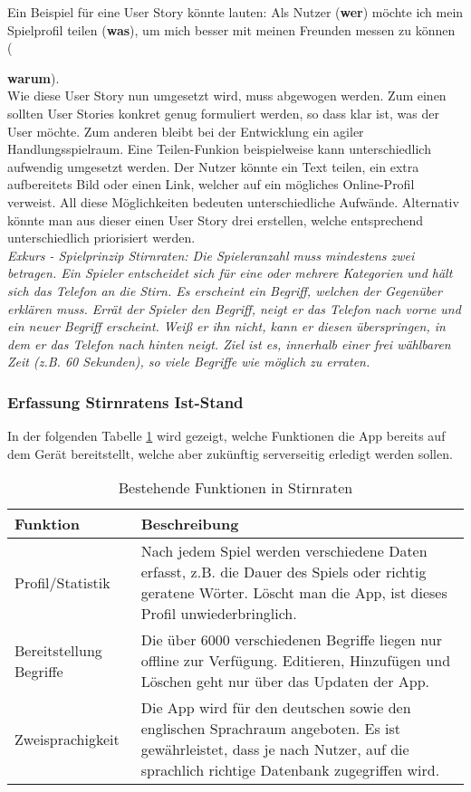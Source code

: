 Ein Beispiel für eine User Story könnte lauten: Als Nutzer (\textbf{wer}) möchte ich mein Spielprofil teilen (\textbf{was}), um mich besser mit meinen Freunden messen zu können ({\textbf{warum}).\\
	
Wie diese User Story nun umgesetzt wird, muss abgewogen werden. Zum einen sollten User Stories konkret genug formuliert werden, so dass klar ist, was der User möchte. Zum anderen bleibt bei der Entwicklung ein agiler Handlungsspielraum.\cite{UserStoryMapping} Eine Teilen-Funkion beispielweise kann unterschiedlich aufwendig umgesetzt werden. Der Nutzer könnte ein Text teilen, ein extra aufbereitets Bild oder einen Link, welcher auf ein mögliches Online-Profil verweist. All diese Möglichkeiten bedeuten unterschiedliche Aufwände. Alternativ könnte man aus dieser einen User Story drei erstellen, welche entsprechend unterschiedlich priorisiert werden.\\

\textit{Exkurs - Spielprinzip Stirnraten: Die Spieleranzahl muss mindestens zwei betragen. Ein Spieler entscheidet sich für eine oder mehrere Kategorien und hält sich das Telefon an die Stirn. Es erscheint ein Begriff, welchen der Gegenüber erklären muss. Errät der Spieler den Begriff, neigt er das Telefon nach vorne und ein neuer Begriff erscheint. Weiß er ihn nicht, kann er diesen überspringen, in dem er das Telefon nach hinten neigt. Ziel ist es, innerhalb einer frei wählbaren Zeit (z.B. 60 Sekunden), so viele Begriffe wie möglich zu erraten.}

\subsubsection{Erfassung Stirnratens Ist-Stand}

In der folgenden Tabelle \ref{tab:bestehende_funktionen} wird gezeigt, welche Funktionen die App bereits auf dem Gerät bereitstellt, welche aber zukünftig serverseitig erledigt werden sollen. 

\begin{table}[H]
	\begin{center}
		\begin{tabular}{p{3cm}p{10cm}}
			Funktion & Beschreibung \\ \hline
			Profil/Statistik & Nach jedem Spiel werden verschiedene Daten erfasst, z.B. die Dauer des Spiels oder richtig geratene Wörter. Löscht man die App, ist dieses Profil unwiederbringlich. \\
			Bereitstellung Begriffe & Die über 6000 verschiedenen Begriffe liegen nur offline zur Verfügung. Editieren, Hinzufügen und Löschen geht nur über das Updaten der App.\\
			Zweisprachigkeit & Die App wird für den deutschen sowie den englischen Sprachraum angeboten. Es ist gewährleistet, dass je nach Nutzer, auf die sprachlich richtige Datenbank zugegriffen wird.\\
		\end{tabular}
	\end{center}
	\caption[Bestehende Funktionen in Stirnraten]{Bestehende Funktionen in Stirnraten}
	\label{tab:bestehende_funktionen} 
\end{table}

}

